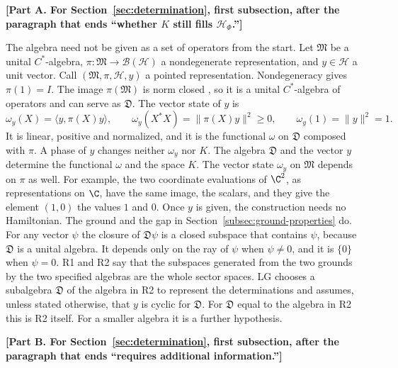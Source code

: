 \par\medskip\noindent\textbf{[Part A. For Section~\ref{sec:determination}, first subsection, after the paragraph that ends ``whether $K$ still fills $\mathcal H_\Phi$.'']}\par\smallskip

The algebra need not be given as a set of operators from the start. Let $\mathfrak M$ be a unital $C^*$-algebra, $\pi:\mathfrak M\to\mathcal B(\mathcal H)$ a nondegenerate representation, and $y\in\mathcal H$ a unit vector. Call $(\mathfrak M,\pi,\mathcal H,y)$ a pointed representation. Nondegeneracy gives $\pi(1)=I$. The image $\pi(\mathfrak M)$ is norm closed \cite{BratteliRobinson}, so it is a unital $C^*$-algebra of operators and can serve as $\mathfrak D$. The vector state of $y$ is
\begin{equation}
 \omega_y(X)=\langle y,\pi(X)y\rangle,\qquad
 \omega_y(X^*X)=\|\pi(X)y\|^2\geq0,\qquad
 \omega_y(1)=\|y\|^2=1 .
 \label{eq:pointed-vector-state}
\end{equation}
It is linear, positive and normalized, and it is the functional $\omega$ on $\mathfrak D$ composed with $\pi$. A phase of $y$ changes neither $\omega_y$ nor $K$. The algebra $\mathfrak D$ and the vector $y$ determine the functional $\omega$ and the space $K$. The vector state $\omega_y$ on $\mathfrak M$ depends on $\pi$ as well. For example, the two coordinate evaluations of $\C^2$, as representations on $\C$, have the same image, the scalars, and they give the element $(1,0)$ the values $1$ and $0$. Once $y$ is given, the construction needs no Hamiltonian. The ground and the gap in Section~\ref{subsec:ground-properties} do. For any vector $\psi$ the closure of $\mathfrak D\psi$ is a closed subspace that contains $\psi$, because $\mathfrak D$ is a unital algebra. It depends only on the ray of $\psi$ when $\psi\ne0$, and it is $\{0\}$ when $\psi=0$. R1 and R2 say that the subspaces generated from the two grounds by the two specified algebras are the whole sector spaces. LG chooses a subalgebra $\mathfrak D$ of the algebra in R2 to represent the determinations and assumes, unless stated otherwise, that $y$ is cyclic for $\mathfrak D$. For $\mathfrak D$ equal to the algebra in R2 this is R2 itself. For a smaller algebra it is a further hypothesis.

\par\medskip\noindent\textbf{[Part B. For Section~\ref{sec:determination}, first subsection, after the paragraph that ends ``requires additional information.'']}\par\smallskip

